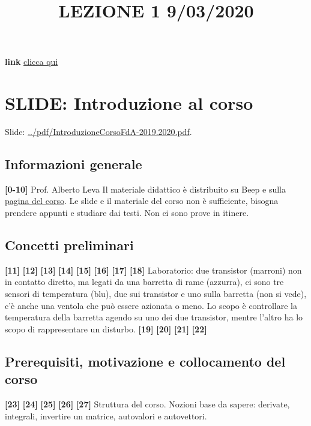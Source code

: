 \title{LEZIONE 1 9/03/2020}\newline
\textbf{link} \href{https://web.microsoftstream.com/video/6164a9b1-4d0a-4f37-a279-2e0ec1e8ca25?list=user&userId=faa91214-a6f5-40d7-8875-253fd49b8ce1}{clicca qui}
\section{SLIDE: Introduzione al corso}
Slide: \url{../pdf/IntroduzioneCorsoFdA-2019.2020.pdf}.
\subsection{Informazioni generale}
\textbf{[0-10]}\;\newline
Prof. Alberto Leva \newline
Il materiale didattico è distribuito su Beep e sulla \href{http://home.deib.polimi.it/leva/}{pagina del corso}.\newline
Le slide e il materiale del corso non è sufficiente, bisogna prendere appunti e studiare dai testi.\newline
Non ci sono prove in itinere.
\subsection{Concetti preliminari}
\textbf{[11]}\;
\newline\textbf{[12]}\;
\newline\textbf{[13]}\;
\newline\textbf{[14]}\;
\newline\textbf{[15]}\;
\newline\textbf{[16]}\;
\newline\textbf{[17]}\;
\newline\textbf{[18]}\; Laboratorio: due transistor (marroni) non in contatto diretto, ma legati da una barretta di rame (azzurra), ci sono tre sensori di temperatura (blu), due sui transistor e uno sulla barretta (non si vede), c'è anche una ventola che può essere azionata o meno. Lo scopo è controllare la temperatura della barretta agendo su uno dei due transistor, mentre l'altro ha lo scopo di rappresentare un disturbo.
\newline\textbf{[19]}\;
\newline\textbf{[20]}\;
\newline\textbf{[21]}\;
\newline\textbf{[22]}\;
\subsection{Prerequisiti, motivazione e collocamento del corso}
\textbf{[23]}\;
\newline\textbf{[24]}\;
\newline\textbf{[25]}\;
\newline\textbf{[26]}\;
\newline\textbf{[27]}\; Struttura del corso. Nozioni base da sapere: derivate, integrali, invertire un matrice, autovalori e autovettori. 

